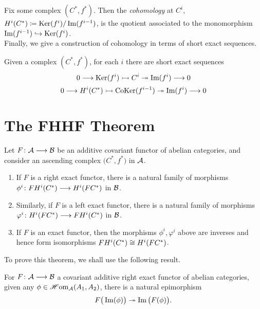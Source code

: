 \documentclass[a4paper]{article}
\def\into{\hookrightarrow}
\def\mono{\rightarrowtail}
\def\epi{\twoheadrightarrow}
\begin{document}
Fix some complex $(C^*, f^*)$. Then the \emph{cohomology} at $C^i$, $H^{i}(C^*) \coloneqq \operatorname{Ker}(f^i)/\operatorname{Im}(f^{i-1})$, is the quotient associated to the monomorphism $\im(f^{i-1}) \into \Ker(f^{i})$.\\

Finally, we give a construction of cohomology in terms of short exact sequences.
\begin{Theorem}
    Given a complex $(C^*, f^*)$, for each $i$ there are short exact sequences
    \[
        0 \to \Ker(f^i) \mono C^{i} \epi \im(f^i) \to 0
    \]
    \[
        0 \to H^i(C^*) \mono \CoKer(f^{i-1}) \epi \im(f^{i}) \to 0
    \]
\end{Theorem}

\section{The FHHF Theorem}
\begin{Theorem}
    Let $F\colon\mathcal{A}\longrightarrow \mathcal{B}$ be an additive covariant functor of abelian categories, and consider an ascending complex $\big(C^{*}, f^*\big)$ in $\mathcal{A}$.
    \begin{enumerate}
        \item If $F$ is a right exact functor, there is a natural family of morphisms $\phi^i\colon FH^{i}(C^{*})\longrightarrow H^{i}(FC^{*})$ in $\mathcal{B}$.
        \item Similarly, if $F$ is a left exact functor, there is a natural family of morphisms $\varphi^i\colon H^{i}(FC^{*})\longrightarrow FH^{i}(C^{*})$ in $\mathcal{B}$. 
        \item If $F$ is an exact functor, then the morphisms $\phi^i, \varphi^i$ above are inverses and hence form isomorphisms ${FH^{i}(C^{*})} \cong {H^{i}(FC^{*})}$.
    \end{enumerate}
\end{Theorem}
To prove this theorem, we shall use the following result.
\begin{Lemma}
    For $F\colon\mathcal{A}\longrightarrow \mathcal{B}$ a covariant additive right exact functor of abelian categories, given any $\phi \in \operatorname{\mathscr{H}om}_{\mathcal{A}}(A_1,A_2)$, there is a natural epimorphism %
    \[
        F\big(\im(\phi)\big) \epi \im\big(F(\phi)\big).
    \]
\end{Lemma}
\end{document}
